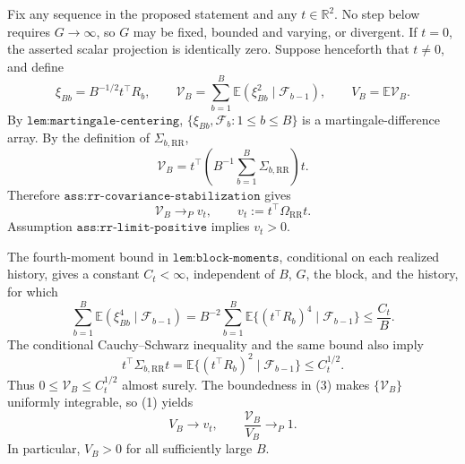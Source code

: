 Fix any sequence in the proposed statement and any \(t\in\mathbb R^2\).  No step below requires \(G\to\infty\), so \(G\) may be fixed, bounded and varying, or divergent.  If \(t=0\), the asserted scalar projection is identically zero.  Suppose henceforth that \(t\ne0\), and define
\[
 \xi_{Bb}=B^{-1/2}t^\top R_b,
 \qquad
 \mathcal V_B=\sum_{b=1}^B
   \mathbb E(\xi_{Bb}^2\mid\mathcal F_{b-1}),
 \qquad
 V_B=\mathbb E\mathcal V_B.
\]
By \(\texttt{lem:martingale-centering}\), \(\{\xi_{Bb},\mathcal F_b:1\le b\le B\}\) is a martingale-difference array.  By the definition of \(\Sigma_{b,\mathrm{RR}}\),
\[
 \mathcal V_B
 =t^\top\left(B^{-1}\sum_{b=1}^B\Sigma_{b,\mathrm{RR}}\right)t.
\]
Therefore \(\texttt{ass:rr-covariance-stabilization}\) gives
\[
 \mathcal V_B\longrightarrow_P v_t,
 \qquad
 v_t:=t^\top\Omega_{\mathrm{RR}}t.                         \tag{1}
\]
Assumption \(\texttt{ass:rr-limit-positive}\) implies \(v_t>0\).

The fourth-moment bound in \(\texttt{lem:block-moments}\), conditional on each realized history, gives a constant \(C_t<\infty\), independent of \(B\), \(G\), the block, and the history, for which
\[
 \sum_{b=1}^B\mathbb E(\xi_{Bb}^4\mid\mathcal F_{b-1})
 =B^{-2}\sum_{b=1}^B
   \mathbb E\{(t^\top R_b)^4\mid\mathcal F_{b-1}\}
 \le \frac{C_t}{B}.                                       \tag{2}
\]
The conditional Cauchy--Schwarz inequality and the same bound also imply
\[
 t^\top\Sigma_{b,\mathrm{RR}}t
 =\mathbb E\{(t^\top R_b)^2\mid\mathcal F_{b-1}\}
 \le C_t^{1/2}.                                            \tag{3}
\]
Thus \(0\le\mathcal V_B\le C_t^{1/2}\) almost surely.  The boundedness in (3) makes \(\{\mathcal V_B\}\) uniformly integrable, so (1) yields
\[
 V_B\longrightarrow v_t,
 \qquad
 \frac{\mathcal V_B}{V_B}\longrightarrow_P1.             \tag{4}
\]
In particular, \(V_B>0\) for all sufficiently large \(B\).

